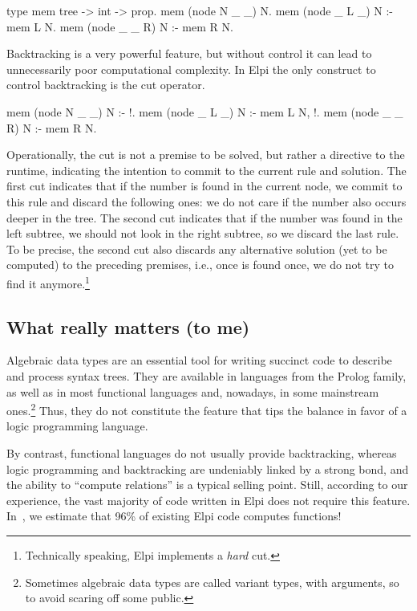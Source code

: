 \documentclass[a4paper, 11pt]{book}
\begin{document}
\begin{elpicode}
type mem tree -> int -> prop.
mem (node N _ _) N.
mem (node _ L _) N :- mem L N.
mem (node _ _ R) N :- mem R N.
\end{elpicode}
Backtracking is a very powerful feature, but without control it can lead to
unnecessarily poor computational complexity. In Elpi the only construct to control
backtracking is the cut operator.

\begin{elpicode}
mem (node N _ _) N :- !.
mem (node _ L _) N :- mem L N, !.
mem (node _ _ R) N :- mem R N.
\end{elpicode}
Operationally, the cut is not a premise to be solved, but rather a directive
to the runtime, indicating the intention to commit to the current rule and
solution. The first cut indicates that if the number is found in the current
node, we commit to this rule and discard the following ones: we do not care if
the number also occurs deeper in the tree. The second cut indicates that if
the number was found in the left subtree, we should not look in the right
subtree, so we discard the last rule. To be precise, the second cut
also discards any alternative solution (yet to be computed) to the preceding
premises, i.e., once  is found once, we do not try
to find it anymore.\footnote{Technically speaking, Elpi implements a \emph{hard}
cut.}

\subsection{What really matters (to me)}


Algebraic data types are an essential tool for writing succinct code to
describe and process syntax trees. They are available in languages from the
Prolog family, as well as in most functional languages and, nowadays,
in some mainstream ones.\footnote{Sometimes algebraic data types are
called variant types, with arguments, so to avoid scaring off some public.}
Thus, they do not
constitute the feature that tips the balance in favor of a logic programming
language.

By contrast, functional languages do not usually provide backtracking, whereas
logic programming and backtracking are undeniably linked by a strong bond, and
the ability to ``compute relations'' is a typical selling point. Still,
according to our experience, the vast majority of code written in Elpi does
not require this feature. In~\cite{elpidet}, we estimate that 96\% of existing
Elpi code computes functions!
\end{document}
